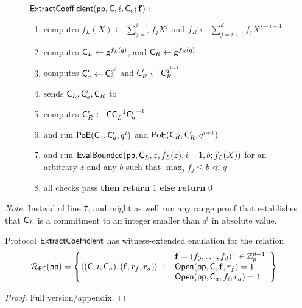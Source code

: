 \begin{figure}[!htp]
\noindent\begin{mdframed}[userdefinedwidth=\textwidth]
\begin{minipage}{\textwidth}
	\begin{flushleft}
	$\textsf{{ExtractCoefficient}}(\textsf{pp}, \mathsf{C}, i, \mathsf{C}_a; \mathbf{f}):$ 
		\begin{enumerate}[nolistsep]
		    \item \prover computes $f_L(X) \gets \sum_{j=0}^{i-1} f_j X^j$ and $f_R \gets \sum_{j=i+1}^d f_j X^{j-i-1}$
		    \item \prover computes $\mathsf{C}_L \gets \mathsf{g}^{f_L(q)}$, and $\mathsf{C}_R \gets \mathsf{g}^{f_R(q)}$
		    \item \prover computes $\mathsf{C}_a' \gets \mathsf{C}_a^{q^i}$ and $\mathsf{C}_R' \gets \mathsf{C}_R^{q^{i+1}}$
		    \item \prover sends $\mathsf{C}_L, \mathsf{C}_a', \mathsf{C}_R$ to \verifier
		    \item \verifier computes $\mathsf{C}_R' \gets \mathsf{C} \mathsf{C}_L^{-1} {\mathsf{C}_a'}^{-1}$
		    \item \prover and \verifier run $\textsf{{PoE}}(\mathsf{C}_a, \mathsf{C}_a', q^i)$ and $\textsf{{PoE}}(\mathsf{C}_R, \mathsf{C}_R', q^{i+1})$
		    \item \prover and \verifier run $\textsf{{EvalBounded}}(\textsf{pp}, \mathsf{C}_L, z, f_L(z), i-1, b; f_L(X))$ for an arbitrary $z$ and any $b$ such that $\max_j f_j \leq b \ll q$
		    \item \pcif{}all checks pass \textbf{then} \textbf{return} 1 \textbf{else} \textbf{return} 0
		\end{enumerate}
	\end{flushleft}
\end{minipage}
\end{mdframed}
\end{figure}

\textit{Note.} Instead of line 7, \prover and \verifier might as well run any range proof that establishes that $\mathsf{C}_L$ is a commitment to an integer smaller than $q^i$ in absolute value.

\begin{lemma}
    Protocol $\textsf{{ExtractCoefficient}}$ has witness-extended emulation for the relation
    \[
        \mathcal{R}_\mathsf{EC}(\textsf{pp}) = \left\{
            \langle(\mathsf{C}, i, \mathsf{C}_a), (\mathbf{f}, r_f, r_a)\rangle \ : \ \begin{array}{l}
                 \mathbf{f} = (f_0, \ldots, f_d)^\mathsf{T} \in \mathbb{Z}_p^{d+1} \\
                 \textsf{{Open}}(\textsf{pp}, \mathsf{C}, \mathbf{f}, r_f) = 1 \\
                 \textsf{{Open}}(\textsf{pp}, \mathsf{C}_a, f_i, r_a) = 1
            \end{array}
        \right \} \enspace .
    \]
\end{lemma}
\begin{proof}
Full version/appendix.
\end{proof}

